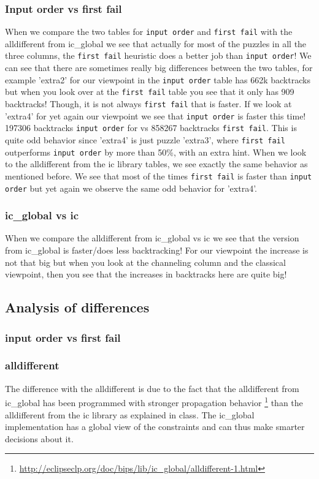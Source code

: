 \documentclass{report}
\begin{document}
\subsubsection{Input order vs first fail}
When we compare the two tables for \texttt{input order} and \texttt{first fail} with the alldifferent from ic\_global we see that actually for most of the puzzles in all the three columns, the \texttt{first fail} heuristic does a better job than \texttt{input order}! We can see that there are sometimes really big differences between the two tables, for example 'extra2' for our viewpoint in the \texttt{input order} table has 662k backtracks but when you look over at the \texttt{first fail} table you see that it only has 909 backtracks! Though, it is not always \texttt{first fail} that is faster. If we look at 'extra4' for yet again our viewpoint we see that \texttt{input order} is faster this time! 197306 backtracks \texttt{input order} for vs 858267 backtracks \texttt{first fail}. This is quite odd behavior since 'extra4' is just puzzle 'extra3', where \texttt{first fail} outperforms \texttt{input order} by more than 50\%, with an extra hint.
\newline
\newline
When we look to the alldifferent from the ic library tables, we see exactly the same behavior as mentioned before. We see that most of the times \texttt{first fail} is faster than \texttt{input order} but yet again we observe the same odd behavior for 'extra4'. 

\subsubsection{ic\_global vs ic}
When we compare the alldifferent from ic\_global vs ic we see that the version from ic\_global is faster/does less backtracking! For our viewpoint the increase is not that big but when you look at the channeling column and the classical viewpoint, then you see that the increases in backtracks here are quite big! 

\subsection{Analysis of differences}
\subsubsection{input order vs first fail}

\subsubsection{alldifferent}
The difference with the alldifferent is due to the fact that the alldifferent from ic\_global has been programmed with stronger propagation behavior \footnote{\url{http://eclipseclp.org/doc/bips/lib/ic\_global/alldifferent-1.html}} than the alldifferent from the ic library as explained in class. The ic\_global implementation has a global view of the constraints and can thus make smarter decisions about it.
\newpage
\end{document}
